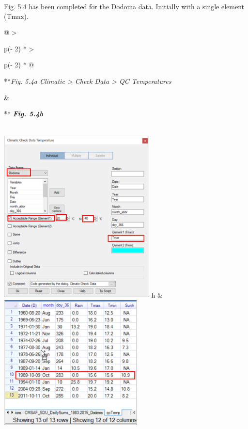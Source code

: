 \documentclass[
  letterpaper,
  DIV=11,
  numbers=noendperiod]{scrreprt}
\begin{document}
Fig. 5.4 has been completed for the Dodoma data. Initially with a single
element (Tmax).

\begin{longtable}[]{@{}
  >{\raggedright\arraybackslash}p{(\columnwidth - 2\tabcolsep) * }
  >{\raggedright\arraybackslash}p{(\columnwidth - 2\tabcolsep) * }@{}}
\toprule\noalign{}
\begin{minipage}[b]{\linewidth}\raggedright
**\emph{Fig. 5.4a Climatic \textgreater{} Check Data \textgreater{} QC
Temperatures}
\end{minipage} & \begin{minipage}[b]{\linewidth}\raggedright
** \textbf{\emph{Fig. 5.4b}}
\end{minipage} \\
\midrule\noalign{}
\endhead
\bottomrule\noalign{}
\endlastfoot
\includegraphics[width=3.12316in,height=3.50468in]{figures/Fig5.4a.png}
h &
\includegraphics[width=2.86714in,height=\textheight]{figures/Fig5.4b.png} \\
\end{longtable}
\end{document}
